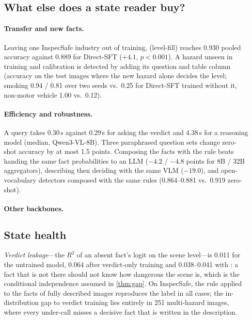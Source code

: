 \subsection{What else does a state reader buy?}
\label{sec:exp-more}

\paragraph{Transfer and new facts.} Leaving one InspecSafe industry out of training, \lux (level-fill) reaches 0.930 pooled accuracy against 0.889 for Direct-SFT ($+4.1$, $p<0.001$). A hazard unseen in training and calibration is detected by adding its question and table column (accuracy on the test images where the new hazard alone decides the level; smoking 0.94 / 0.81 over two seeds vs.\ 0.25 for Direct-SFT trained without it, non-motor vehicle 1.00 vs.\ 0.12).

\paragraph{Efficiency and robustness.} A \lux query takes 0.30\,s against 0.29\,s for asking the verdict and 4.38\,s for a reasoning model (median, Qwen3-VL-8B). Three paraphrased question sets change zero-shot accuracy by at most 1.5 points. Composing the facts with the rule beats handing the same fact probabilities to an LLM ($-4.2$ / $-4.8$ points for 8B / 32B aggregators), describing then deciding with the same VLM ($-19.0$), and open-vocabulary detectors composed with the same rules (0.864--0.881 vs.\ 0.919 zero-shot).

\paragraph{Other backbones.} 

\subsection{State health}
\label{sec:exp-health}

\emph{Verdict leakage}---the $R^2$ of an absent fact's logit on the scene level---is 0.011 for the untrained model, 0.064 after verdict-only training and 0.038--0.041 with \lux: a fact that is not there should not know how dangerous the scene is, which is the conditional independence assumed in \cref{thm:gap}. On InspecSafe, the rule applied to the facts of fully described images reproduces the label in all cases; the in-distribution gap to verdict training lies entirely in 251 multi-hazard images, where every under-call misses a decisive fact that is written in the description.

